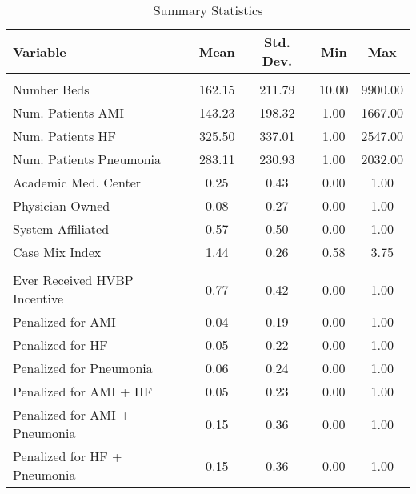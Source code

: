 \begin{table}[ht!]
\centering
\caption{\label{sumstats}Summary Statistics}
\centering
\begin{tabular}[t]{lcccc}
\toprule
Variable & Mean & Std. Dev. & Min & Max\\
\midrule
\addlinespace[0.3em]
\multicolumn{5}{l}{\textbf{Hospital Characteristics}}\\
\hspace{1em}Number Beds & 162.15 & 211.79 & 10.00 & 9900.00\\
\hspace{1em}Num. Patients AMI & 143.23 & 198.32 & 1.00 & 1667.00\\
\hspace{1em}Num. Patients HF & 325.50 & 337.01 & 1.00 & 2547.00\\
\hspace{1em}Num. Patients Pneumonia & 283.11 & 230.93 & 1.00 & 2032.00\\
\hspace{1em}Academic Med. Center & 0.25 & 0.43 & 0.00 & 1.00\\
\hspace{1em}Physician Owned & 0.08 & 0.27 & 0.00 & 1.00\\
\hspace{1em}System Affiliated & 0.57 & 0.50 & 0.00 & 1.00\\
\hspace{1em}Case Mix Index & 1.44 & 0.26 & 0.58 & 3.75\\
\addlinespace[0.3em]
\multicolumn{5}{l}{\textbf{Penalty/Payment Variables}}\\
\hspace{1em}Ever Received HVBP Incentive & 0.77 & 0.42 & 0.00 & 1.00\\
\hspace{1em}Penalized for AMI & 0.04 & 0.19 & 0.00 & 1.00\\
\hspace{1em}Penalized for HF & 0.05 & 0.22 & 0.00 & 1.00\\
\hspace{1em}Penalized for Pneumonia & 0.06 & 0.24 & 0.00 & 1.00\\
\hspace{1em}Penalized for AMI + HF & 0.05 & 0.23 & 0.00 & 1.00\\
\hspace{1em}Penalized for AMI + Pneumonia & 0.15 & 0.36 & 0.00 & 1.00\\
\hspace{1em}Penalized for HF + Pneumonia & 0.15 & 0.36 & 0.00 & 1.00\\

\end{tabular}
\end{table}
